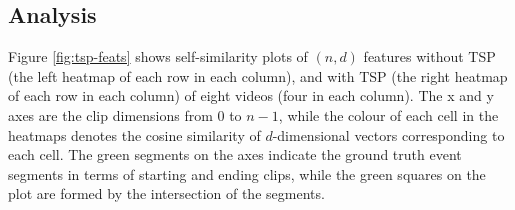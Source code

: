 \subsection{Analysis}
\par Figure \ref{fig:tsp-feats} shows self-similarity plots of $(n, d)$ features without TSP (the left heatmap of each row in each column), and with TSP (the right heatmap of each row in each column) of eight videos (four in each column). The x and y axes are the clip dimensions from $0$ to $n-1$, while the colour of each cell in the heatmaps denotes the cosine similarity of $d$-dimensional vectors corresponding to each cell. The green segments on the axes indicate the ground truth event segments in terms of starting and ending clips, while the green squares on the plot are formed by the intersection of the segments.

